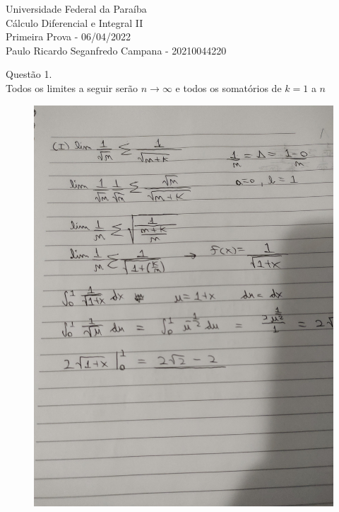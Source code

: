 \documentclass[12pt]{article}
\begin{document}
\begin{center}
	Universidade Federal da Paraíba\\
	Cálculo Diferencial e Integral II\\
	Primeira Prova - 06/04/2022\\
	Paulo Ricardo Seganfredo Campana - 20210044220\\
\end{center}

Questão 1.\\
Todos os limites a seguir serão $n \rightarrow \infty$ e todos os somatórios de $k=1$ a $n$\\
\begin{figure}[h!]
	\includegraphics[scale=0.14]{q11}
\end{figure}
\end{document}
